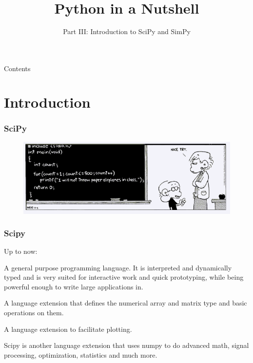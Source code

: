 \documentclass[10pt,colorlinks]{beamer}
\title{ Python in a Nutshell}
\subtitle
{Part III: Introduction to SciPy and SimPy} %
\begin{document}
\begin{frame}[plain]
   \maketitle
\end{frame}


\begin{frame}[allowframebreaks]{Contents}
  \tableofcontents
\end{frame}

\section{Introduction}

\begin{frame}[fragile]\frametitle{SciPy}
\begin{figure}[!htb]
    \includegraphics[width=\textwidth]{figs/nicetry}
\end{figure}
\end{frame}
\begin{frame}[fragile]\frametitle{Scipy}
Up to now:
\begin{description}
    \item<1->[python]  A general purpose programming language. It is interpreted and dynamically typed and is very suited for interactive work and quick prototyping, while being powerful enough to write large applications in.
    \item<2->[Numpy] A language extension that defines the numerical array and matrix type and basic operations on them.
    \item<3->[matplotlib] A language extension to facilitate plotting. 
    \item<4->[Scipy] Scipy is another language extension that uses numpy to do advanced math, signal processing, optimization, statistics and much more.

\end{description}
\end{frame}
\end{document}
